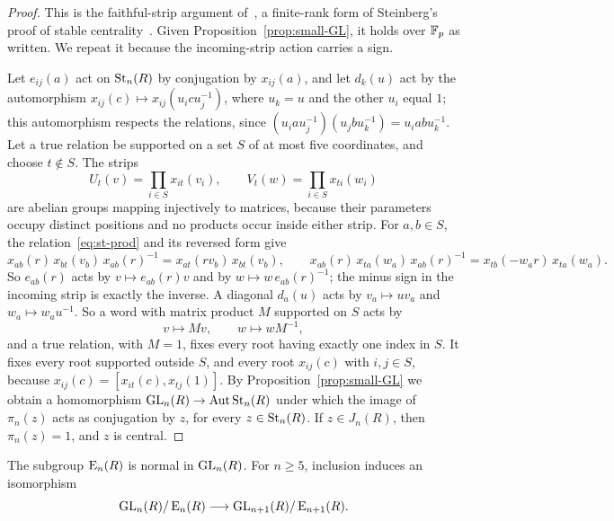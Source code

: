 \begin{proof}
This is the faithful-strip argument of~\cite[Proposition~5.4]{OAI247periodic}, a finite-rank form of Steinberg's proof of
stable centrality~\cite[Section~7]{Steinberg1967}. Given Proposition~\ref{prop:small-GL}, it holds over $\mathbb F_p$ as
written. We repeat it because the incoming-strip action carries a sign.

Let $e_{ij}(a)$ act on $\operatorname{St}_n(R)$ by conjugation by $x_{ij}(a)$, and let $d_k(u)$ act by the automorphism
$x_{ij}(c)\mapsto x_{ij}(u_icu_j^{-1})$, where $u_k=u$ and the other $u_i$ equal $1$; this automorphism respects the
relations, since $(u_iau_j^{-1})(u_jbu_k^{-1})=u_iabu_k^{-1}$. Let a true relation be supported on a set $S$ of at most
five coordinates, and choose $t\notin S$. The strips
\[
 U_t(v)=\prod_{i\in S}x_{it}(v_i),\qquad V_t(w)=\prod_{i\in S}x_{ti}(w_i)
\]
are abelian groups mapping injectively to matrices, because their parameters occupy distinct positions and no
products occur inside either strip. For $a,b\in S$, the relation~\eqref{eq:st-prod} and its reversed form give
\[
 x_{ab}(r)\,x_{bt}(v_b)\,x_{ab}(r)^{-1}=x_{at}(rv_b)\,x_{bt}(v_b),\qquad
 x_{ab}(r)\,x_{ta}(w_a)\,x_{ab}(r)^{-1}=x_{tb}(-w_ar)\,x_{ta}(w_a).
\]
So $e_{ab}(r)$ acts by $v\mapsto e_{ab}(r)v$ and by $w\mapsto w\,e_{ab}(r)^{-1}$; the minus sign in the incoming strip
is exactly the inverse. A diagonal $d_a(u)$ acts by $v_a\mapsto uv_a$ and $w_a\mapsto w_au^{-1}$. So a word with matrix
product $M$ supported on $S$ acts by
\[
 v\longmapsto Mv,\qquad w\longmapsto wM^{-1},
\]
and a true relation, with $M=1$, fixes every root having exactly one index in $S$. It fixes every root supported
outside $S$, and every root $x_{ij}(c)$ with $i,j\in S$, because $x_{ij}(c)=[x_{it}(c),x_{tj}(1)]$. By
Proposition~\ref{prop:small-GL} we obtain a homomorphism $\operatorname{GL}_n(R)\to\operatorname{Aut}\operatorname{St}_n(R)$ under which the image of
$\pi_n(z)$ acts as conjugation by $z$, for every $z\in\operatorname{St}_n(R)$. If $z\in J_n(R)$, then $\pi_n(z)=1$, and $z$ is
central.
\end{proof}

\begin{lemma}\label{lem:GL-E}
The subgroup $\operatorname{E}_n(R)$ is normal in $\operatorname{GL}_n(R)$. For $n\geq5$, inclusion induces an isomorphism
\[
 \operatorname{GL}_n(R)/\operatorname{E}_n(R)\longrightarrow\operatorname{GL}_{n+1}(R)/\operatorname{E}_{n+1}(R).
\]
\end{lemma}

